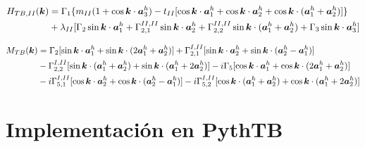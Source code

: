 \documentclass[
  letterpaper,
  DIV=11,
  numbers=noendperiod]{scrreprt}
\begin{document}
\[
\begin{align}
    H_{TB,II} (\boldsymbol{k}) &=
    \Gamma_1 \lbrace m_{II}(1+ \cos{\boldsymbol{k}\cdot \boldsymbol{a}_3^h}) - t_{II}[\cos{\boldsymbol{k}\cdot \boldsymbol{a}_1^h} + \cos{\boldsymbol{k}\cdot \boldsymbol{a}_2^h} + \cos{\boldsymbol{k}\cdot (\boldsymbol{a}_1^h + \boldsymbol{a}_2^h)}] \rbrace \nonumber \\ 
    & + \lambda_{II} [\Gamma_2 \sin{\boldsymbol{k}\cdot \boldsymbol{a}_1^h} + \Gamma_{2,1}^{II,II} \sin{\boldsymbol{k}\cdot \boldsymbol{a}_2^h} + \Gamma_{2,2}^{II,II} \sin{\boldsymbol{k}\cdot (\boldsymbol{a}_1^h+\boldsymbol{a}_2^h)} + \Gamma_3 \sin \boldsymbol{k} \cdot \boldsymbol{a}_3^h]
\end{align}
\]

\[
\begin{align}
    M_{TB} (\boldsymbol{k}) &=
    \Gamma_2 [\sin{\boldsymbol{k}\cdot \boldsymbol{a}_1^h} + \sin{\boldsymbol{k}\cdot (2\boldsymbol{a}_1^h+\boldsymbol{a}_2^h)}] + \Gamma_{2,1}^{I,II}[\sin{\boldsymbol{k}\cdot \boldsymbol{a}_2^h} + \sin{\boldsymbol{k}\cdot (\boldsymbol{a}_2^h-\boldsymbol{a}_1^h)}] \nonumber \\
    &- \Gamma_{2,2}^{I,II}[\sin{\boldsymbol{k}\cdot (\boldsymbol{a}_1^h+\boldsymbol{a}_2^h)}+\sin{\boldsymbol{k}\cdot (\boldsymbol{a}_1^h+2\boldsymbol{a}_2^h)}]  - i\Gamma_5[\cos \boldsymbol{k} \cdot \boldsymbol{a}_1^h + \cos{\boldsymbol{k}\cdot (2\boldsymbol{a}_1^h+\boldsymbol{a}_2^h)}] \nonumber \\
    &-i\Gamma_{5,1}^{I,II} [\cos{\boldsymbol{k}\cdot \boldsymbol{a}_2^h}+ \cos{\boldsymbol{k}\cdot (\boldsymbol{a}_2^h-\boldsymbol{a}_1^h)}] -i\Gamma_{5,2}^{I,II}[\cos {\boldsymbol{k}\cdot (\boldsymbol{a}_1^h + \boldsymbol{a}_2^h)}+\cos {\boldsymbol{k}\cdot (\boldsymbol{a}_1^h + 2\boldsymbol{a}_2^h)}]
\end{align}
\]

\hypertarget{implementaciuxf3n-en-pythtb}{%
\section{Implementación en PythTB}\label{implementaciuxf3n-en-pythtb}}
\end{document}
